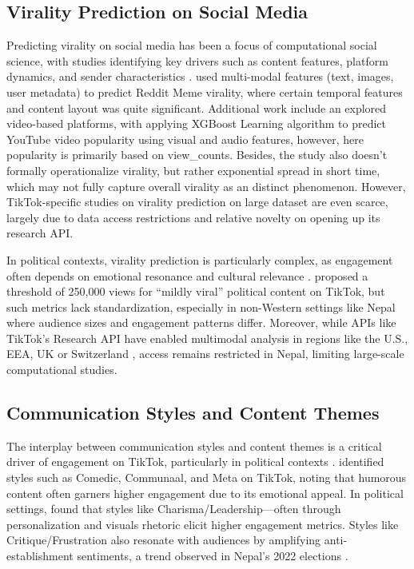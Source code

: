 \documentclass[12pt,a4paper]{report}
\begin{document}
\subsection{Virality Prediction on Social Media}

Predicting virality on social media has been a focus of computational social science, with studies identifying key drivers such as content features, platform dynamics, and sender characteristics \parencite{berger2012viral}. \parencite{SahJordan2025DecodingReddit} used multi-modal features (text, images, user metadata) to predict Reddit Meme virality, where certain temporal features and content layout was quite significant. Additional work include an  explored video-based platforms, with \parencite{nisa2021optimizing} applying XGBoost Learning algorithm to predict YouTube video popularity using visual and audio features, however, here popularity is primarily based on view\_counts. Besides, the study also doesn't formally operationalize virality, but rather exponential spread in short time, which may not fully capture overall virality as an distinct phenomenon. However, TikTok-specific studies on virality prediction on large dataset are even scarce, largely due to data access restrictions and relative novelty on opening up its research API.

In political contexts, virality prediction is particularly complex, as engagement often depends on emotional resonance and cultural relevance \parencite{berger2012viral}. \parencite{ingelstam2023populism} proposed a threshold of 250,000 views for “mildly viral” political content on TikTok, but such metrics lack standardization, especially in non-Western settings like Nepal where audience sizes and engagement patterns differ. Moreover, while APIs like TikTok’s Research API have enabled multimodal analysis in regions like the U.S., EEA, UK or Switzerland \parencite{tiktokResearchAPI2025}, access remains restricted in Nepal, limiting large-scale computational studies. 

\subsection{Communication Styles and Content Themes}

The interplay between communication styles and content themes is a critical driver of engagement on TikTok, particularly in political contexts \parencite{umansky2023dances}. \parencite{schellewald2021communicative} identified styles such as Comedic, Communaal, and Meta on TikTok, noting that humorous content often garners higher engagement due to its emotional appeal. In political settings, \parencite{cseri2024masterarbeit} found that styles like Charisma/Leadership—often through personalization and visuals rhetoric elicit higher engagement metrics. Styles like Critique/Frustration also resonate with audiences by amplifying anti-establishment sentiments, a trend observed in Nepal’s 2022 elections \parencite{dahal2023influence}.
\end{document}
